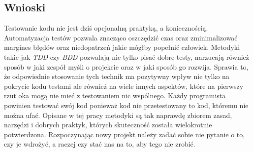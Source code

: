   \subsection{Wnioski}
  
  Testowanie kodu nie jest dziś opcjonalną praktyką, a koniecznością. Automatyzacja testów pozwala znacząco oszczędzić czas oraz zminimalizować margines błędów oraz niedopatrzeń jakie mógłby popełnić człowiek. Metodyki takie jak \emph{TDD} czy \emph{BDD} pozwalają nie tylko pisać dobre testy, narzucają również sposób w jaki zespół myśli o projekcie oraz w jaki sposób go rozwija. Sprawia to, że odpowiednie stosowanie tych technik ma pozytywny wpływ nie tylko na pokrycie kodu testami ale również na wiele innych aspektów, które na pierwszy rzut oka mogą nie mieć z testowaniem nic wspólnego. Każdy programista powinien testować swój kod ponieważ kod nie przetestowany to kod, któremu nie można ufać. Opisane w tej pracy metodyki są tak naprawdę zbiorem zasad, narzędzi i dobrych praktyk, których skuteczność została wielokrotnie potwierdzona. Rozpoczynając nowy projekt należy zadać sobie nie pytanie o to, czy je wdrożyć, a raczej czy stać nas na to, aby tego nie zrobić.
  